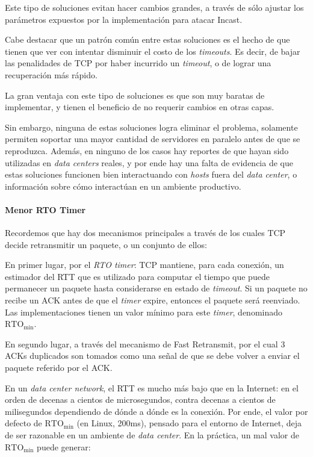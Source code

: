 \documentclass[runningheads,a4paper]{llncs}
\begin{document}
Este tipo de soluciones evitan hacer cambios grandes, a través de sólo ajustar los parámetros expuestos por la implementación para atacar Incast.

Cabe destacar que un patrón común entre estas soluciones es el hecho de que tienen que ver con intentar disminuir el costo de los \textit{timeouts}. Es decir, de bajar las penalidades de TCP por haber incurrido un \textit{timeout}, o de lograr una recuperación más rápido.

La gran ventaja con este tipo de soluciones es que son muy baratas de implementar, y tienen el beneficio de no requerir cambios en otras capas.

Sin embargo, ninguna de estas soluciones logra eliminar el problema, solamente permiten soportar una mayor cantidad de servidores en paralelo antes de que se reproduzca. Además, en ninguno de los casos hay reportes de que hayan sido utilizadas en \textit{data centers} reales, y por ende hay una falta de evidencia de que estas soluciones funcionen bien interactuando con \textit{hosts} fuera del \textit{data center}, o información sobre cómo interactúan en un ambiente productivo.

\paragraph{Menor RTO Timer}

Recordemos que hay dos mecanismos principales a través de los cuales TCP decide retransmitir un paquete, o un conjunto de ellos:

En primer lugar, por el \textit{RTO timer}: TCP mantiene, para cada conexión, un estimador del RTT que es utilizado para computar el tiempo que puede permanecer un paquete hasta considerarse en estado de \textit{timeout}. Si un paquete no recibe un ACK antes de que el \textit{timer} expire, entonces el paquete será reenviado. Las implementaciones tienen un valor mínimo para este \textit{timer}, denominado $\text{RTO}_{\text{min}}$.

En segundo lugar, a través del mecanismo de Fast Retransmit, por el cual 3 ACKs duplicados son tomados como una señal de que se debe volver a enviar el paquete referido por el ACK.

En un \textit{data center network}, el RTT es mucho más bajo que en la Internet: en el orden de decenas a cientos de microsegundos, contra decenas a cientos de milisegundos dependiendo de dónde a dónde es la conexión. Por ende, el valor por defecto de $\text{RTO}_{\text{min}}$ (en Linux, 200ms), pensado para el entorno de Internet, deja de ser razonable en un ambiente de \textit{data center}. En la práctica, un mal valor de $\text{RTO}_{\text{min}}$ puede generar:
\end{document}
